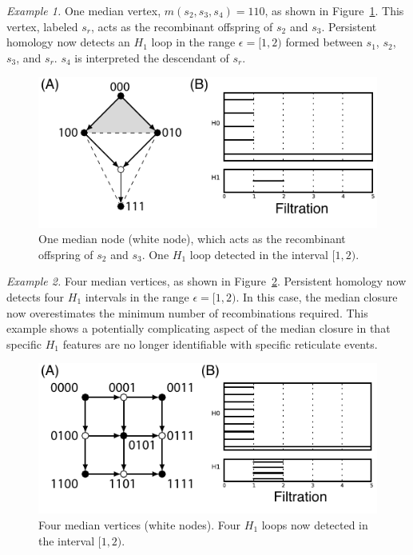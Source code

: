 \emph{Example 1.}
One median vertex, $m(s_2,s_3,s_4)=110$, as shown in Figure~\ref{fig:example_1_revisited}.
This vertex, labeled $s_r$, acts as the recombinant offspring of $s_2$ and $s_3$.
Persistent homology now detects an $H_{1}$ loop in the range $\epsilon=[1,2)$ formed between $s_1$, $s_2$, $s_3$, and $s_r$.
$s_4$ is interpreted the descendant of $s_r$.

\begin{figure}
\centering
\includegraphics[width=\columnwidth]{fig/complex_construction/example_1_revisited.pdf}
\caption[The Median Complex Recovers Reticulation in Example One]{One median node (white node), which acts as the recombinant offspring of $s_2$ and $s_3$. One $H_1$ loop detected in the interval $[1,2)$.}
\label{fig:example_1_revisited}
\end{figure}

\emph{Example 2.}
Four median vertices, as shown in Figure~\ref{fig:example_2_revisited}.
Persistent homology now detects four $H_{1}$ intervals in the range $\epsilon=[1,2)$.
In this case, the median closure now overestimates the minimum number of recombinations required.
This example shows a potentially complicating aspect of the median closure in that specific $H_1$ features are no longer identifiable with specific reticulate events.

\begin{figure}
\centering
\includegraphics[width=\columnwidth]{fig/complex_construction/example_2_revisited.pdf}
\caption[The Median Complex Recovers Reticulation in Example Two]{Four median vertices (white nodes). Four $H_1$ loops now detected in the interval $[1,2)$.}
\label{fig:example_2_revisited}
\end{figure}

